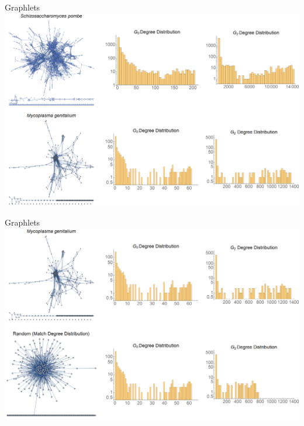 \documentclass[xcolor=dvipsnames, 14pt]{beamer}
\begin{document}
\begin{frame}{Graphlets}
\centering
\includegraphics[width=\textwidth]{graphlet_degree_distributions_TOP.png}
\end{frame}

\begin{frame}{Graphlets}
\centering
\includegraphics[width=\textwidth]{graphlet_degree_distributions_MIDDLE.png}
\end{frame}
\end{document}
